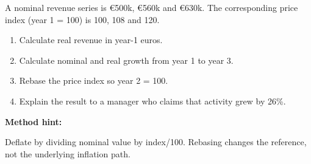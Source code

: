 \documentclass[11pt,a4paper]{article}
\newcommand{\tightlist}{\setlength{\itemsep}{0pt}\setlength{\parskip}{0pt}}
\begin{document}
A nominal revenue series is €500k, €560k and €630k. The corresponding price index (year 1 = 100) is 100, 108 and 120.

\begin{enumerate}
\tightlist
\item
  Calculate real revenue in year-1 euros.
\item
  Calculate nominal and real growth from year 1 to year 3.
\item
  Rebase the price index so year 2 = 100.
\item
  Explain the result to a manager who claims that activity grew by 26\%.
\end{enumerate}

\textbf{Method hint:}

Deflate by dividing nominal value by index/100. Rebasing changes the reference, not the underlying inflation path.
\end{document}
